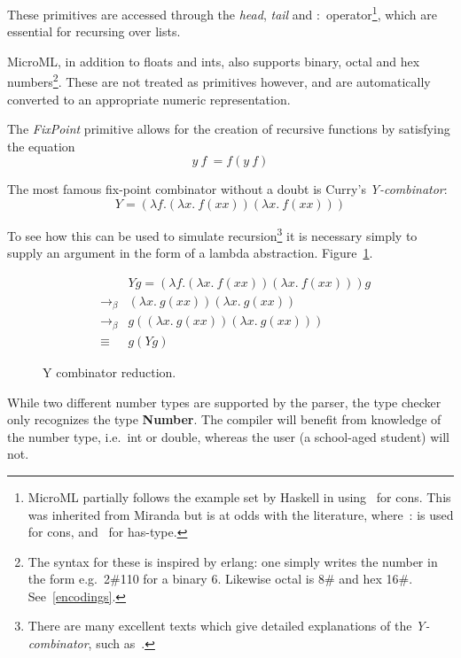 \documentclass[12pt, a4paper]{report}
\begin{document}
These primitives are accessed through the \textit{head}, \textit{tail} and \textbf{$:$}
operator\footnote{MicroML partially follows the example set by Haskell in using~\: for cons. This
was inherited from Miranda but is at odds with the literature, where~\:: is used for cons, and~\: for
has-type.}, which are essential for recursing over lists.

MicroML, in addition to floats and ints, also supports binary, octal and hex numbers\footnote{The
syntax for these is inspired by erlang: one simply writes the number in the form e.g.\ 2\#110 for a
binary 6. Likewise octal is 8\# and hex 16\#. See~\ref{encodings}.}. These are not treated as primitives however, and are
automatically converted to an appropriate numeric representation.

The \textit{FixPoint} primitive allows for the creation of recursive functions by satisfying the equation
\begin{displaymath}
    y\ f\ = f (y\ f)
\end{displaymath}

The most famous fix-point combinator without a doubt is Curry's \textit{Y-combinator}:
\begin{displaymath}
    Y = (\lambda f. (\lambda x.\ f (x x)) (\lambda x.\ f (x x)))
\end{displaymath}

To see how this can be used to simulate recursion\footnote{There are many excellent texts which
give detailed explanations of the \textit{Y-combinator}, such as~\cite{citeulike:4001400}.} it is necessary simply
to supply an argument in the form of a lambda abstraction. Figure~\ref{fig:yCombinator}.

\begin{figure}
        \begin{eqnarray*}
            && Y g = (\lambda f. (\lambda x.\ f (x x)) (\lambda x.\ f (x x))) g \\
            & \to_\beta & (\lambda x.\ g (x x)) (\lambda x.\ g (x x)) \\
            & \to_\beta & g ((\lambda x.\ g (x x)) (\lambda x.\ g (x x))) \\
            & \equiv & g (Y g)
        \end{eqnarray*}
    \caption{Y combinator reduction.}
    \label{fig:yCombinator}
\end{figure}

While two different number types are supported by the parser, the type checker only recognizes the
type \textbf{Number}. The compiler will benefit from knowledge of the number type, i.e.\ int or double,
whereas the user (a school-aged student) will not.
\end{document}
